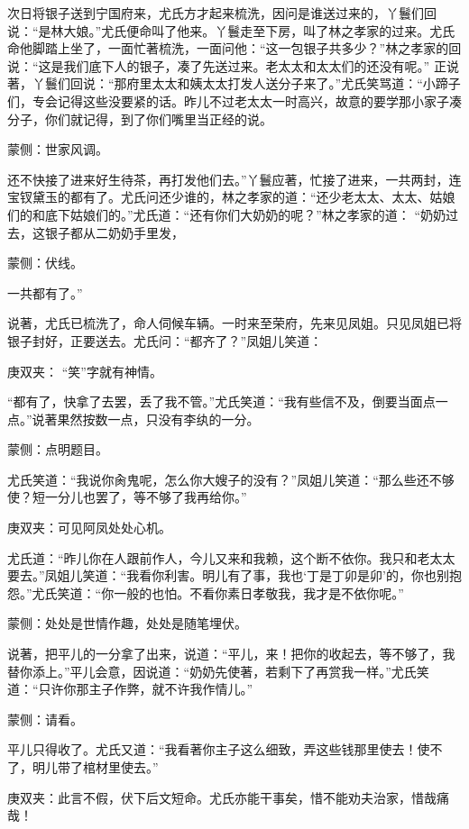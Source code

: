\begin{parag}
    次日将银子送到宁国府来，尤氏方才起来梳洗，因问是谁送过来的，丫鬟们回说：“是林大娘。”尤氏便命叫了他来。丫鬟走至下房，叫了林之孝家的过来。尤氏命他脚踏上坐了，一面忙著梳洗，一面问他：“这一包银子共多少？”林之孝家的回说：“这是我们底下人的银子，凑了先送过来。老太太和太太们的还没有呢。” 正说著，丫鬟们回说：“那府里太太和姨太太打发人送分子来了。”尤氏笑骂道：“小蹄子们，专会记得这些没要紧的话。昨儿不过老太太一时高兴，故意的要学那小家子凑分子，你们就记得，到了你们嘴里当正经的说。\begin{note}蒙侧：世家风调。\end{note}还不快接了进来好生待茶，再打发他们去。”丫鬟应著，忙接了进来，一共两封，连宝钗黛玉的都有了。尤氏问还少谁的，林之孝家的道：“还少老太太、太太、姑娘们的和底下姑娘们的。”尤氏道：“还有你们大奶奶的呢？”林之孝家的道： “奶奶过去，这银子都从二奶奶手里发，\begin{note}蒙侧：伏线。\end{note}一共都有了。”
\end{parag}


\begin{parag}
    说著，尤氏已梳洗了，命人伺候车辆。一时来至荣府，先来见凤姐。只见凤姐已将银子封好，正要送去。尤氏问：“都齐了？”凤姐儿笑道：\begin{note}庚双夹： “笑”字就有神情。\end{note}“都有了，快拿了去罢，丢了我不管。”尤氏笑道：“我有些信不及，倒要当面点一点。”说著果然按数一点，只没有李纨的一分。\begin{note}蒙侧：点明题目。\end{note}尤氏笑道：“我说你肏鬼呢，怎么你大嫂子的没有？”凤姐儿笑道：“那么些还不够使？短一分儿也罢了，等不够了我再给你。”\begin{note}庚双夹：可见阿凤处处心机。\end{note}尤氏道：“昨儿你在人跟前作人，今儿又来和我赖，这个断不依你。我只和老太太要去。”凤姐儿笑道：“我看你利害。明儿有了事，我也‘丁是丁卯是卯’的，你也别抱怨。”尤氏笑道：“你一般的也怕。不看你素日孝敬我，我才是不依你呢。”\begin{note}蒙侧：处处是世情作趣，处处是随笔埋伏。\end{note}说著，把平儿的一分拿了出来，说道：“平儿，来！把你的收起去，等不够了，我替你添上。”平儿会意，因说道：“奶奶先使著，若剩下了再赏我一样。”尤氏笑道：“只许你那主子作弊，就不许我作情儿。”\begin{note}蒙侧：请看。\end{note}平儿只得收了。尤氏又道：“我看著你主子这么细致，弄这些钱那里使去！使不了，明儿带了棺材里使去。”\begin{note}庚双夹：此言不假，伏下后文短命。尤氏亦能干事矣，惜不能劝夫治家，惜哉痛哉！\end{note}
\end{parag}


